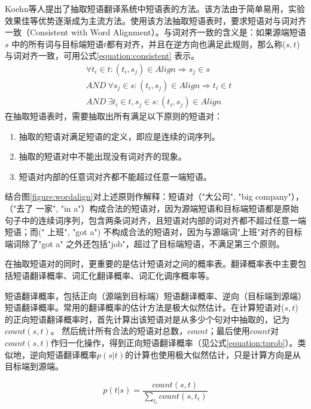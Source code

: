 \documentclass[master, winfont]{njuthesis}
\begin{document}
Koehn等人\cite{koehn2003statistical,koehn2009statistical}提出了抽取短语翻译系统中短语表的方法。该方法由于简单易用，实验效果佳等优势逐渐成为主流方法。使用该方法抽取短语表时，要求短语对与词对齐一致（Consistent with Word Alignment）。与词对齐一致的含义是：如果源端短语$s$ 中的所有词与目标端短语$t$都有对齐，并且在逆方向也满足此规则，那么称($s, t$) 与词对齐一致，可用公式\ref{equation:consistent} 表示。
\begin{equation}
  \label{equation:consistent}
  \begin{aligned}
    &\forall t_i \in t: (t_i, s_j) \in Align \Rightarrow s_j \in s \\
   &AND~\forall s_j \in s: (t_i, s_j) \in Align \Rightarrow t_i \in t \\
   &AND~\exists t_i\in t, s_j \in s: (t_i, s_j) \in Align
  \end{aligned}
\end{equation}
在抽取短语表时，需要抽取出所有满足以下原则的短语对：
\begin{enumerate}
  \item 抽取的短语对满足短语的定义，即应是连续的词序列。
  \item 抽取的短语对中不能出现没有词对齐的现象。
  \item 短语对内部的任意词对齐都不能超过任意一端短语。
\end{enumerate}

结合图\ref{figure:wordalign}对上述原则作解释：短语对（"大公司", "big company"），（"去了 一家", "in a"）构成合法的短语对，因为源端短语和目标端短语都是原始句子中的连续词序列，包含两条词对齐，且短语对内部的词对齐都不超过任意一端短语；而(" 上班", "got a") 不构成合法的短语对，因为与源端词"上班"对齐的目标端词除了"got a" 之外还包括"job"，超过了目标端短语，不满足第三个原则。

在抽取短语对的同时，更重要的是估计短语对之间的概率表。翻译概率表中主要包括短语翻译概率、词汇化翻译概率、词汇化调序概率等。

短语翻译概率，包括正向（源端到目标端）短语翻译概率、逆向（目标端到源端）短语翻译概率。常用的翻译概率的估计方法是极大似然估计。在计算短语对($s,t$)的正向短语翻译概率时，首先计算出该短语对是从多少个句对中抽取的，记为$count(s,t)$。 然后统计所有合法的短语对总数，$count$；最后使用$count$对$count(s, t)$作归一化操作，得到正向短语翻译概率（见公式\ref{equation:tprob}）。类似地，逆向短语翻译概率$p(s|t)$的计算也使用极大似然估计，只是计算方向是从目标端到源端。

\begin{equation}\label{equation:tprob}
  p(t|s)=\frac{count(s,t)}{\sum_{t_i}count(s, t_i)}
\end{equation}
\end{document}

